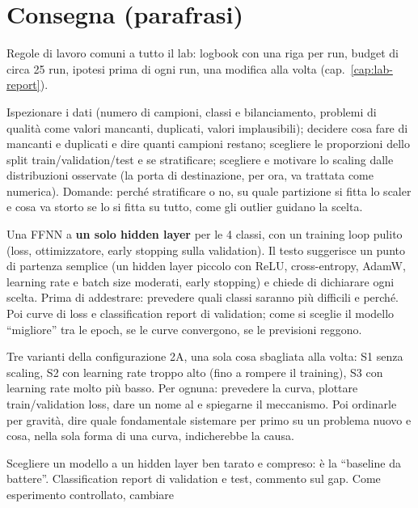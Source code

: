 \section{Consegna (parafrasi)}
Regole di lavoro comuni a tutto il lab: logbook con una riga per run, budget di circa 25 run,
ipotesi prima di ogni run, una modifica alla volta (cap.~\ref{cap:lab-report}).

\begin{description}[style=nextline,leftmargin=1.2em]
\item[Task 1 -- Preprocessing (nessun run)]
  Ispezionare i dati (numero di campioni, classi e bilanciamento, problemi di qualità come valori
  mancanti, duplicati, valori implausibili); decidere cosa fare di mancanti e duplicati e dire quanti
  campioni restano; scegliere le proporzioni dello split train/validation/test e se stratificare;
  scegliere e motivare lo scaling dalle distribuzioni osservate (la porta di destinazione, per ora,
  va trattata come numerica). Domande: perché stratificare o no, su quale partizione si fitta lo
  scaler e cosa va storto se lo si fitta su tutto, come gli outlier guidano la scelta.
\item[Task 2A -- Un primo classificatore]
  Una FFNN a \textbf{un solo hidden layer} per le 4 classi, con un training loop pulito (loss,
  ottimizzatore, early stopping sulla validation). Il testo suggerisce un punto di partenza semplice
  (un hidden layer piccolo con ReLU, cross-entropy, AdamW, learning rate e batch size moderati, early
  stopping) e chiede di dichiarare ogni scelta. Prima di addestrare: prevedere quali classi saranno
  più difficili e perché. Poi curve di loss e classification report di validation; come si sceglie il
  modello ``migliore'' tra le epoch, se le curve convergono, se le previsioni reggono.
\item[Task 2B -- Perché i fondamentali contano]
  Tre varianti della configurazione 2A, una sola cosa sbagliata alla volta: S1 senza scaling, S2 con
  learning rate troppo alto (fino a rompere il training), S3 con learning rate molto più basso. Per
  ognuna: prevedere la curva, plottare train/validation loss, dare un nome al  e
  spiegarne il meccanismo. Poi ordinarle per gravità, dire quale fondamentale sistemare per primo su
  un problema nuovo e cosa, nella sola forma di una curva, indicherebbe la causa.
\item[Task 2C -- Fissare la baseline]
  Scegliere un modello a un hidden layer ben tarato e compreso: è la ``baseline da battere''.
  Classification report di validation e test, commento sul gap. Come esperimento controllato, cambiare

\end{description}
